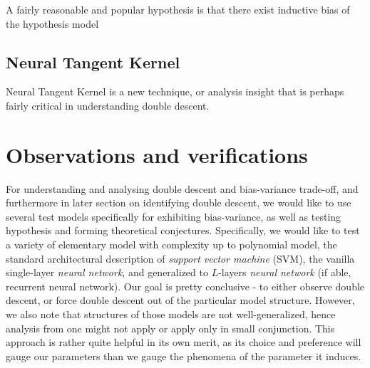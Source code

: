 A fairly reasonable and popular hypothesis is that there exist inductive bias of the hypothesis model 

\subsection{Neural Tangent Kernel}

Neural Tangent Kernel is a new technique, or analysis insight that is perhaps fairly critical in understanding double descent. 

\clearpage

\section{Observations and verifications}

For understanding and analysing double descent and bias-variance trade-off, and furthermore in later section on identifying double descent, we would like to use several test models specifically for exhibiting bias-variance, as well as testing hypothesis and forming theoretical conjectures. Specifically, we would like to test a variety of elementary model with complexity up to polynomial model, the standard architectural description of \textit{support vector machine} (SVM), the vanilla single-layer \textit{neural network}, and generalized to $L$-layers \textit{neural network} (if able, recurrent neural network). Our goal is pretty conclusive - to either observe double descent, or force double descent out of the particular model structure. However, we also note that structures of those models are not well-generalized, hence analysis from one might not apply or apply only in small conjunction. This approach is rather quite helpful in its own merit, as its choice and preference will gauge our parameters than we gauge the phenomena of the parameter it induces. 

